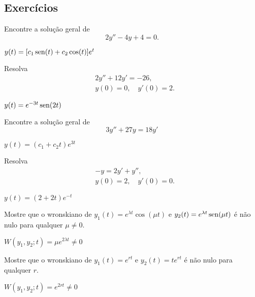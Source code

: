 \subsection*{Exercícios}

\begin{exer}
  Encontre a solução geral de
  \begin{equation}
    2y'' - 4y + 4 = 0.
  \end{equation}
\end{exer}
\begin{resp}
  $y(t) = [c_1\operatorname{sen}(t) + c_2\cos(t)]e^{t}$
\end{resp}

\begin{exer}
  Resolva
  \begin{align}
    &2y'' + 12y' = -26,\\
    &y(0) = 0,\quad y'(0) = 2.
  \end{align}
\end{exer}
\begin{resp}
  $y(t) = e^{-3t}\operatorname{sen}(2t)$
\end{resp}

\begin{exer}
  Encontre a solução geral de
  \begin{equation}
    3y'' + 27y = 18y'
  \end{equation}
\end{exer}
\begin{resp}
  $y(t) = (c_1 + c_2t)e^{3t}$
\end{resp}

\begin{exer}
  Resolva
  \begin{align}
    &-y = 2y' + y'',\\
    &y(0) = 2,\quad y'(0) = 0.
  \end{align}
\end{exer}
\begin{resp}
  $y(t) = (2 + 2t)e^{-t}$
\end{resp}

\begin{ex}
  Mostre que o wronskiano de $y_1(t) = e^{\lambda t}\cos(\mu t)$ e $y_2(t) = e^{\lambda t}\operatorname{sen}(\mu t)$ é não nulo para qualquer $\mu\neq 0$.
\end{ex}
\begin{resp}
  $W(y_1,y_2;t) = \mu e^{2\lambda t} \neq 0$
\end{resp}

\begin{ex}
  Mostre que o wronskiano de $y_1(t) = e^{rt}$ e $y_2(t) = te^{rt}$ é não nulo para qualquer $r$.  
\end{ex}
\begin{resp}
  $W(y_1,y_2;t) = e^{2rt} \neq 0$
\end{resp}

